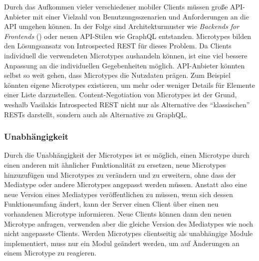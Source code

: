 \para{}Durch das Aufkommen vieler verschiedener mobiler Clients müssen große API-Anbieter mit einer Vielzahl von Benutzungsszenarien und Anforderungen an die API umgehen können. In der Folge sind Architekturmuster wie \emph{Backends for Frontends} (\autocite{Plotnicki2015}) oder neuen API-Stilen wie GraphQL \autocite{Giroux2019} entstanden. Microtypes bilden den Lösungsansatz von Introspected REST für dieses Problem. Da Clients individuell die verwendeten Microtypes aushandeln können, ist eine viel bessere Anpassung an die individuellen Gegebenheiten möglich. API-Anbieter könnten selbst so weit gehen, dass Microtypes die Nutzdaten prägen. Zum Beispiel könnten eigene Microtypes existieren, um mehr oder weniger Details für Elemente einer Liste darzustellen. Content-Negotiation von Microtypes ist der Grund, weshalb Vasilakis Introspected REST nicht nur als Alternative des \enquote{klassischen} RESTs darstellt, sondern auch als Alternative zu GraphQL.

\subsubsection{Unabhängigkeit}
Durch die Unabhängigkeit der Microtypes ist es möglich, einen Microtype durch einen anderen mit ähnlicher Funktionalität zu ersetzen, neue Microtypes hinzuzufügen und Microtypes zu verändern und zu erweitern, ohne dass der Mediatype oder andere Microtypes angepasst werden müssen. Anstatt also eine neue Version eines Mediatypes veröffentlichen zu müssen, wenn sich dessen Funktionsumfang ändert, kann der Server einen Client über einen neu vorhandenen Microtype informieren. Neue Clients können dann den neuen Microtype anfragen, verwenden aber die gleiche Version des Mediatypes wie noch nicht angepasste Clients. Werden Microtypes clientseitig als unabhängige Module implementiert, muss nur ein Modul geändert werden, um auf Änderungen an einem Microtype zu reagieren.

